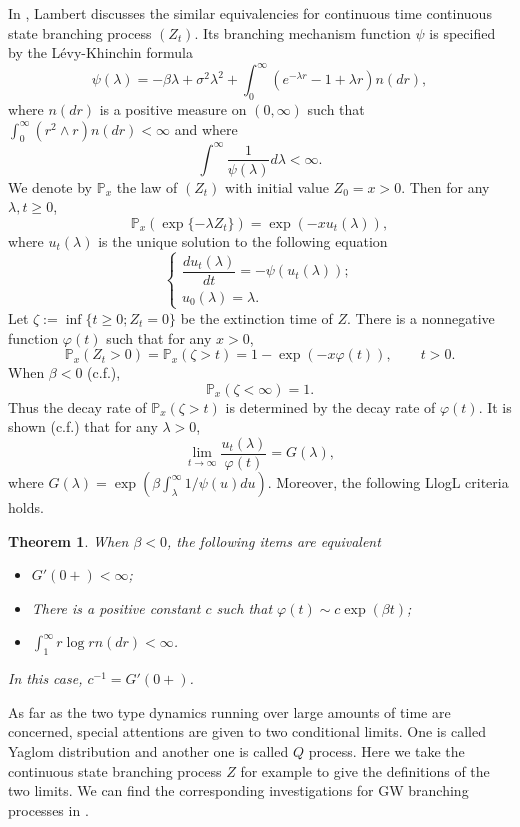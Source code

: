 \documentclass[12pt,a4paper]{amsart}
\numberwithin{equation}{section}
\theoremstyle{plain}
\newtheorem{thm}{Theorem}[section]
\theoremstyle{definition}
\begin{document}
  In \cite{Lambert2001Arbres,Lambert2003Coalescence}, Lambert discusses the similar equivalencies for continuous time continuous state branching process $(Z_t)$.
  Its branching mechanism function $\psi$ is specified by the L\'evy-Khinchin formula
\[
	\psi(\lambda)=-\beta\lambda+\sigma^2\lambda^2+\int_0^\infty \left(e^{-\lambda r}-1+\lambda r\right)n(dr),
\]
where $n(dr)$ is a positive measure on $(0,\infty)$ such that $\int_0^\infty(r^2\wedge r) n(dr)<\infty$ and where
\begin{equation}\label{eq:_extinc_assump_for_continuous}
	\int^\infty\frac{1}{\psi(\lambda)}d\lambda<\infty.
\end{equation}
We denote by $\mathbb P_x$ the law of $(Z_t)$ with initial value $Z_0=x>0$.
Then for any $\lambda, t\geq 0$,
\[
	\mathbb P_x\left(\exp\{-\lambda Z_t\}\right)=\exp(-xu_t(\lambda)),
\]
where $u_t(\lambda)$ is the unique solution to the following equation
\begin{equation}
  \begin{cases}
    \dfrac{d u_t(\lambda)}{dt}=-\psi(u_t(\lambda));\\
    u_0(\lambda)=\lambda.
  \end{cases}
\end{equation}
Let $\zeta:=\inf\{t\geq 0; Z_t=0\}$ be the extinction time of $Z$. There is a
nonnegative function $\varphi(t)$ such that for any $x>0$,
\[
	\mathbb P_x(Z_t>0)=\mathbb P_x(\zeta>t)=1-\exp(-x\varphi(t)), \qquad t>0.
\]
When $\beta<0$ (c.f.\cite{Grey1974Asymptotic}),
\[
	\mathbb P_x(\zeta<\infty)=1.
\]
Thus the decay rate of $\mathbb P_x(\zeta>t)$ is determined by the decay rate of
$\varphi(t)$. It is shown (c.f.\cite{Lambert2007Quasistationary}) that for any
$\lambda>0$,
\[
	\lim_{t\rightarrow\infty}\frac{u_t(\lambda)}{\varphi(t)}=G(\lambda),
\]
where $G(\lambda)=\exp(\beta\int_{\lambda}^\infty1/\psi(u)du)$. Moreover, the
following LlogL criteria holds.
\begin{thm}
  \label{thm:equivalent_for_cbp}
	When $\beta<0$, the following items are equivalent
  \begin{itemize}
  \item[$(i).$] $G'(0+)<\infty$;
  \item[$(ii).$] There is a positive constant $c$ such that $\varphi(t)\sim
    c\exp(\beta t)$;
  \item[$(iii).$] $\int_1^\infty r\log r n(dr)<\infty$.
  \end{itemize}
  In this case, $c^{-1}=G'(0+)$.
\end{thm}
As far as the two type dynamics running over large amounts of time are
concerned, special attentions are given to two conditional limits. One is called
Yaglom distribution and another one is called $Q$ process. Here we take the
continuous state branching process $Z$ for example to give the definitions of
the two limits. We can find the corresponding investigations for GW branching
processes in \cite{AthreyaNey1972Branching}.
\end{document}
